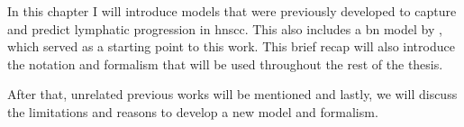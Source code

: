\documentclass[../ms.tex]{subfiles}
\begin{document}
In this chapter I will introduce models that were previously developed to capture and predict lymphatic progression in \gls{hnscc}. This also includes a \gls{bn} model by \cite{pouymayou_bayesian_2019}, which served as a starting point to this work. This brief recap will also introduce the notation and formalism that will be used throughout the rest of the thesis.

After that, unrelated previous works will be mentioned and lastly, we will discuss the limitations and reasons to develop a new model and formalism.
\end{document}
